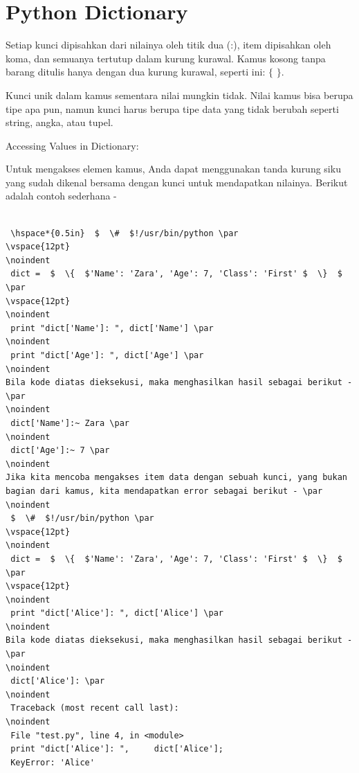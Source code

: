  \section{Python Dictionary}
\vspace{12pt}
\noindent 
Setiap kunci dipisahkan dari nilainya oleh titik dua (:), item dipisahkan oleh koma, dan semuanya tertutup dalam kurung kurawal. Kamus kosong tanpa barang ditulis hanya dengan dua kurung kurawal, seperti ini:  $  \{  $ $  \}  $. \par
\noindent 
Kunci unik dalam kamus sementara nilai mungkin tidak. Nilai kamus bisa berupa tipe apa pun, namun kunci harus berupa tipe data yang tidak berubah seperti string, angka, atau tupel. \par
\vspace{12pt}
\noindent 
\vspace{\baselineskip}
Accessing Values in Dictionary: \par
\noindent 
Untuk mengakses elemen kamus, Anda dapat menggunakan tanda kurung siku yang sudah dikenal bersama dengan kunci untuk mendapatkan nilainya. Berikut adalah contoh sederhana - \par
\noindent 
\begin{verbatim}

 \hspace*{0.5in}  $  \#  $!/usr/bin/python \par
\vspace{12pt}
\noindent 
 dict =  $  \{  $'Name': 'Zara', 'Age': 7, 'Class': 'First' $  \}  $ \par
\vspace{12pt}
\noindent 
 print "dict['Name']: ", dict['Name'] \par
\noindent 
 print "dict['Age']: ", dict['Age'] \par
\noindent 
Bila kode diatas dieksekusi, maka menghasilkan hasil sebagai berikut - \par
\noindent 
 dict['Name']:~ Zara \par
\noindent 
 dict['Age']:~ 7 \par
\noindent 
Jika kita mencoba mengakses item data dengan sebuah kunci, yang bukan bagian dari kamus, kita mendapatkan error sebagai berikut - \par
\noindent 
 $  \#  $!/usr/bin/python \par
\vspace{12pt}
\noindent 
 dict =  $  \{  $'Name': 'Zara', 'Age': 7, 'Class': 'First' $  \}  $ \par
\vspace{12pt}
\noindent 
 print "dict['Alice']: ", dict['Alice'] \par
\noindent 
Bila kode diatas dieksekusi, maka menghasilkan hasil sebagai berikut - \par
\noindent 
 dict['Alice']: \par
\noindent 
 Traceback (most recent call last): 
\noindent 
 File "test.py", line 4, in <module>  
 print "dict['Alice']: ",     dict['Alice'];  
 KeyError: 'Alice' 
\end{verbatim}
